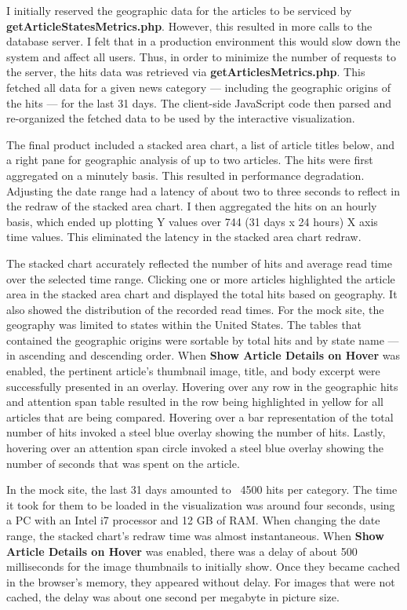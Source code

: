 \documentclass[12pt]{article}
\begin{document}
{I initially reserved the geographic data for the articles to be serviced by \textbf{getArticleStatesMetrics.php}. However, this resulted in more calls to the database server. I felt that in a production environment this would slow down the system and affect all users. Thus, in order to minimize the number of requests to the server, the hits data was retrieved via \textbf{getArticlesMetrics.php}. This fetched all data for a given news category --- including the geographic origins of the hits --- for the last 31 days. The client-side JavaScript code then parsed and re-organized the fetched data to be used by the interactive visualization.

The final product included a stacked area chart, a list of article titles below, and a right pane for geographic analysis of up to two articles. The hits were first aggregated on a minutely basis. This resulted in performance degradation. Adjusting the date range had a latency of about two to three seconds to reflect in the redraw of the stacked area chart. I then aggregated the hits on an hourly basis, which ended up plotting Y values over 744 (31 days x 24 hours) X axis time values. This eliminated the latency in the stacked area chart redraw. 
 
The stacked chart accurately reflected the number of hits and average read time over the selected time range. Clicking one or more articles highlighted the article area in the stacked area chart and displayed the total hits based on geography. It also showed the distribution of the recorded read times. For the mock site, the geography was limited to states within the United States. The tables that contained the geographic origins were sortable by total hits and by state name --- in ascending and descending order. When \textbf{Show Article Details on Hover} was enabled, the pertinent article's thumbnail image, title, and body excerpt were successfully presented in an overlay. Hovering over any row in the geographic hits and attention span table resulted in the row being highlighted in yellow for all articles that are being compared. Hovering over a bar representation of the total number of hits invoked a steel blue overlay showing the number of hits. Lastly, hovering over an attention span circle invoked a steel blue overlay showing the number of seconds that was spent on the article.

In the mock site, the last 31 days amounted to ~4500 hits per category. The time it took for them to be loaded in the visualization was around four seconds, using a PC with an Intel i7 processor and 12 GB of RAM. When changing the date range, the stacked chart's redraw time was almost instantaneous. When \textbf{Show Article Details on Hover} was enabled, there was a delay of about 500 milliseconds for the image thumbnails to initially show. Once they became cached in the browser's memory, they appeared without delay. For images that were not cached, the delay was about one second per megabyte in picture size.

}
\end{document}
